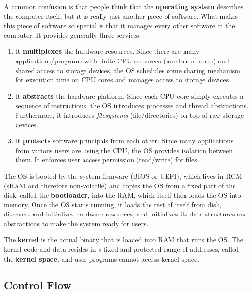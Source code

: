 \documentclass{article}
\begin{document}
    \begin{definition}
      A common confusion is that people think that the \textbf{operating system} describes the computer itself, but it is really just another piece of software. What makes this piece of software so special is that it manages every other software in the computer. It provides generally three services: 
      \begin{enumerate}
        \item It \textbf{multiplexes} the hardware resources. Since there are many applications/programs with finite CPU resources (number of cores) and shared access to storage devices, the OS schedules some sharing mechanism for execution time on CPU cores and manages access to storage devices.
        \item It \textbf{abstracts} the hardware platform. Since each CPU core simply executes a sequence of instructions, the OS introduces processes and thread abstractions. Furthermore, it introduces \textit{filesystems} (file/directories) on top of raw storage devices. 
        \item It \textbf{protects} software principals from each other. Since many applications from various users are using the CPU, the OS provides isolation between them. It enforces user access permission (read/write) for files. 
      \end{enumerate}
    \end{definition}

    The OS is booted by the system firmware (BIOS or UEFI), which lives in ROM (sRAM and therefore non-volatile) and copies the OS from a fixed part of the disk, called the \textbf{bootloader}, into the RAM, which itself then loads the OS into memory. Once the OS starts running, it loads the rest of itself from disk, discovers and initializes hardware resources, and initializes its data structures and abstractions to make the system ready for users.

    \begin{definition}[Kernel]
      The \textbf{kernel} is the actual binary that is loaded into RAM that runs the OS. The kernel code and data resides in a fixed and protected range of addresses, called the \textbf{kernel space}, and user programs cannot access kernel space. 
    \end{definition}

  \subsection{Control Flow}
\end{document}

